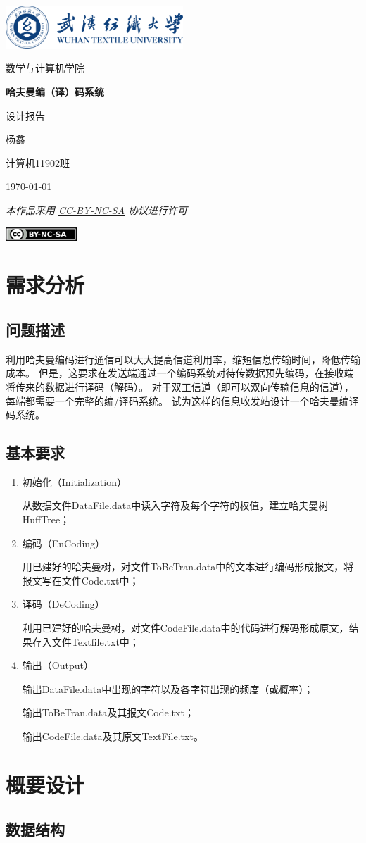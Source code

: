 \documentclass{ctexart}
\newcommand{\makecover}[4]{
    \begin{titlepage}
        \centering
        \includegraphics[width=0.5\textwidth]{logo.png}\par
        \vspace{1cm}
        {\kaishu\ziju{0.1}\Huge 数学与计算机学院}\par
        \vspace{5.0cm}
        {\bfseries\ziju{0.1}\zihao{-0} #1}\par
        \vspace{5.0cm}
        {\kaishu\ziju{0.1}\Huge #2}\par
        \vspace{0.7cm}
        {\kaishu\Large #3}\par
        \vspace{1em}
        {\kaishu\large #4}\par
        \vspace{2em}
        {\itshape 本作品采用 \href{https://creativecommons.org/licenses/by-nc-sa/4.0/}{CC-BY-NC-SA} 协议进行许可}\par
        \vspace{1em}
        \includegraphics[width=0.2\textwidth]{cc-by-nc-sa.png}
    \end{titlepage}
}
\begin{document}
    \makecover{哈夫曼编（译）码系统\par \vspace{0.3em}设计报告}{杨鑫}{计算机11902班}{\today}
    
    \section{需求分析}
    \subsection{问题描述}
    利用哈夫曼编码进行通信可以大大提高信道利用率，缩短信息传输时间，降低传输成本。
    但是，这要求在发送端通过一个编码系统对待传数据预先编码，在接收端将传来的数据进行译码（解码）。
    对于双工信道（即可以双向传输信息的信道），每端都需要一个完整的编/译码系统。
    试为这样的信息收发站设计一个哈夫曼编译码系统。
    
    \subsection{基本要求}
    \begin{enumerate}[\indent (1)]
        \item 初始化（Initialization）
        \par 从数据文件DataFile.data中读入字符及每个字符的权值，建立哈夫曼树HuffTree；
        \item 编码（EnCoding）
        \par 用已建好的哈夫曼树，对文件ToBeTran.data中的文本进行编码形成报文，将报文写在文件Code.txt中；
        \item 译码（DeCoding）
        \par 利用已建好的哈夫曼树，对文件CodeFile.data中的代码进行解码形成原文，结果存入文件Textfile.txt中；
        \item 输出（Output）
        \par 输出DataFile.data中出现的字符以及各字符出现的频度（或概率）；
        \par 输出ToBeTran.data及其报文Code.txt；
        \par 输出CodeFile.data及其原文TextFile.txt。
    \end{enumerate}

    \section{概要设计}
    \subsection{数据结构}
\end{document}

